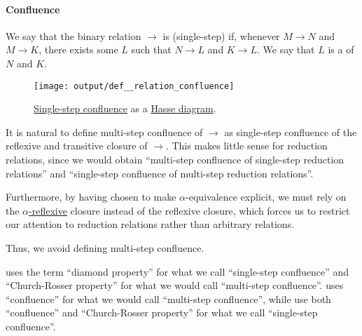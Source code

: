 \paragraph{Confluence}

\begin{definition}\label{def:relation_confluence}\mimprovised
  We say that the binary relation \( {\to} \) is (single-step)  if, whenever \( M \to N \) and \( M \to K \), there exists some \( L \) such that \( N \to L \) and \( K \to L \). We say that \( L \) is a  of \( N \) and \( K \).

  \begin{figure}[!ht]
    \centering
    \texttt{[image: output/def\_\_relation\_confluence]}
    \caption{\hyperref[def:relation_confluence]{Single-step confluence} as a \hyperref[def:hasse_diagram]{Hasse diagram}.}\label{fig:def:relation_confluence}
  \end{figure}
\end{definition}
\begin{comments}
  \item It is natural to define multi-step confluence of \( {\to} \) as single-step confluence of the reflexive and transitive closure of \( {\to} \). This makes little sense for reduction relations, since we would obtain \enquote{multi-step confluence of single-step reduction relations} and \enquote{single-step confluence of multi-step reduction relations}.

  Furthermore, by having chosen to make \( \alpha \)-equivalence explicit, we must rely on the \hyperref[def:alpha_reflexive_closure]{\( \alpha \)-reflexive} closure instead of the reflexive closure, which forces us to restrict our attention to reduction relations rather than arbitrary relations.

  Thus, we avoid defining multi-step confluence.

  \item {} uses the term \enquote{diamond property} for what we call \enquote{single-step confluence} and \enquote{Church-Rosser property} for what we would call \enquote{multi-step confluence}.  uses \enquote{confluence} for what we would call \enquote{multi-step confluence}, while  use both \enquote{confluence} and \enquote{Church-Rosser property} for what we call \enquote{single-step confluence}.
\end{comments}

